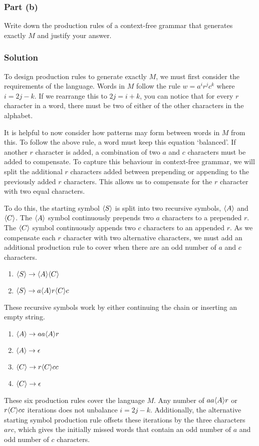 \documentclass[12pt]{article}
\def\<#1>{\langle\ignorespaces#1\unskip\rangle}
\begin{document}
\subsubsection*{Part (b)}

Write down the production rules of a context-free grammar that generates exactly $M$ and justify your answer.

\subsubsection*{Solution}

To design production rules to generate exactly $M$, we must first consider the requirements of the language.
Words in $M$ follow the rule $w = a^{i} r^{j} c^{k}$ where $i = 2j - k$.
If we rearrange this to $2j = i + k$, you can notice that for every $r$ character in a word, there must be two of either of the other characters in the alphabet.

It is helpful to now consider how patterns may form between words in $M$ from this.
To follow the above rule, a word must keep this equation `balanced'.
If another $r$ character is added, a combination of two $a$ and $c$ characters must be added to compensate.
To capture this behaviour in context-free grammar, we will split the additional $r$ characters added between prepending or appending to the previously added $r$ characters.
This allows us to compensate for the $r$ character with two equal characters.

To do this, the starting symbol $\<S>$ is split into two recursive symbols, $\<A>$ and $\<C>$.
The $\<A>$ symbol continuously prepends two $a$ characters to a prepended $r$.
The $\<C>$ symbol continuously appends two $c$ characters to an appended $r$.
As we compensate each $r$ character with two alternative characters, we must add an additional production rule to cover when there are an odd number of $a$ and $c$ characters.
\begin{enumerate}[label = (\arabic*)]
	\item $ \<S> \rightarrow \<A> \<C> $
	\item $ \<S> \rightarrow a \<A> r \<C> c $
\end{enumerate}

These recursive symbols work by either continuing the chain or inserting an empty string.
\begin{enumerate}[label = (\arabic*), resume]
	\item $ \<A> \rightarrow a a \<A> r $
	\item $ \<A> \rightarrow \epsilon $
	\item $ \<C> \rightarrow r \<C> c c $
	\item $ \<C> \rightarrow \epsilon $
\end{enumerate}

These six production rules cover the language $M$.
Any number of $aa\<A>r$ or $r\<C>cc$ iterations does not unbalance $i = 2j - k$.
Additionally, the alternative starting symbol production rule offsets these iterations by the three characters $arc$,
which gives the initially missed words that contain an odd number of $a$ and odd number of $c$ characters.
\end{document}
